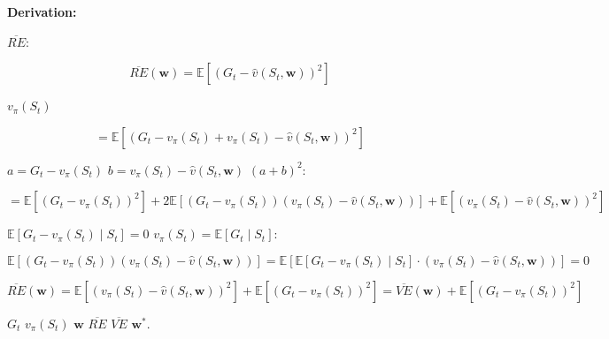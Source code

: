 \documentclass{article}
\begin{document}
\textbf{Derivation:}

 $\overline{RE}$:

\[
\overline{RE}(\mathbf{w}) = \mathbb{E}\left[(G_t - \hat{v}(S_t, \mathbf{w}))^2\right]
\]

 $v_\pi(S_t)$ 

\[
= \mathbb{E}\left[(G_t - v_\pi(S_t) + v_\pi(S_t) - \hat{v}(S_t, \mathbf{w}))^2\right]
\]

 $a = G_t - v_\pi(S_t)$  $b = v_\pi(S_t) - \hat{v}(S_t, \mathbf{w})$ $(a+b)^2$:

\[
= \mathbb{E}\left[(G_t - v_\pi(S_t))^2\right] 
+ 2\mathbb{E}\left[(G_t - v_\pi(S_t))(v_\pi(S_t) - \hat{v}(S_t,\mathbf{w}))\right] 
+ \mathbb{E}\left[(v_\pi(S_t) - \hat{v}(S_t,\mathbf{w}))^2\right]
\]

 $\mathbb{E}[G_t - v_\pi(S_t) \mid S_t] = 0$ 
 $v_\pi(S_t) = \mathbb{E}[G_t \mid S_t]$:

\[
\mathbb{E}\left[(G_t - v_\pi(S_t))(v_\pi(S_t) - \hat{v}(S_t,\mathbf{w}))\right]
= \mathbb{E}\left[\mathbb{E}[G_t - v_\pi(S_t)\mid S_t] \cdot (v_\pi(S_t) - \hat{v}(S_t,\mathbf{w}))\right] = 0
\]


\[
\overline{RE}(\mathbf{w}) 
= \mathbb{E}\left[(v_\pi(S_t) - \hat{v}(S_t,\mathbf{w}))^2\right] 
+ \mathbb{E}\left[(G_t - v_\pi(S_t))^2\right]
= \overline{VE}(\mathbf{w}) + \mathbb{E}\left[(G_t - v_\pi(S_t))^2\right]
\]

 $G_t$  $v_\pi(S_t)$
 $\mathbf{w}$ $\overline{RE}$  $\overline{VE}$ 
 $\mathbf{w}^*$.
\end{document}

